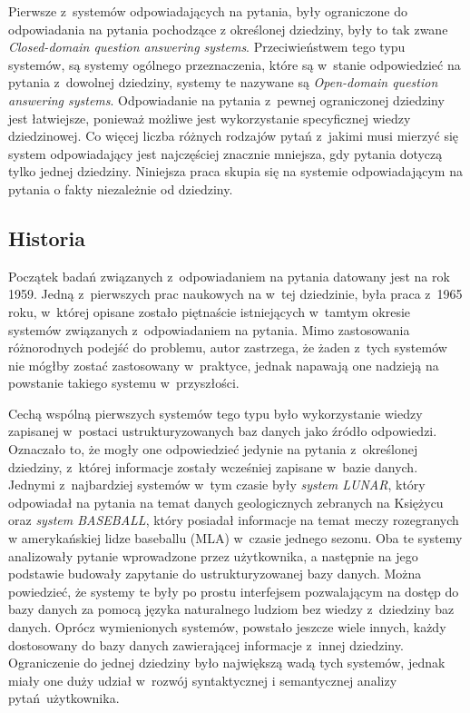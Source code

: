 \documentclass[a4paper, twoside, 12pt]{report}
\begin{document}
            Pierwsze z~systemów odpowiadających na pytania, były ograniczone do odpowiadania na pytania pochodzące z
            określonej dziedziny, były to tak zwane \emph{Closed-domain question answering systems}. Przeciwieństwem
            tego typu systemów, są systemy ogólnego przeznaczenia, które są w~stanie odpowiedzieć na pytania z~dowolnej
            dziedziny, systemy te nazywane są \emph{Open-domain question answering systems}. Odpowiadanie
            na pytania z~pewnej ograniczonej dziedziny jest łatwiejsze, ponieważ możliwe jest wykorzystanie specyficznej
            wiedzy dziedzinowej. Co więcej liczba różnych rodzajów pytań z~jakimi musi mierzyć się system odpowiadający
            jest najczęściej znacznie mniejsza, gdy pytania dotyczą tylko jednej dziedziny. Niniejsza praca skupia się
            na systemie odpowiadającym na pytania o fakty niezależnie od dziedziny.

        \subsection{Historia}
            Początek badań związanych z~odpowiadaniem na pytania datowany jest na rok 1959. Jedną z~pierwszych prac
            naukowych na w~tej dziedzinie, była praca z~1965 roku\cite{FIRSTWORKQA}, w~której opisane zostało piętnaście
            istniejących w~tamtym okresie systemów związanych z~odpowiadaniem na pytania. Mimo zastosowania różnorodnych
            podejść do problemu, autor zastrzega, że żaden z~tych systemów nie mógłby zostać zastosowany w~praktyce,
            jednak napawają one nadzieją na powstanie takiego systemu w~przyszłości.

            Cechą wspólną pierwszych systemów tego typu było wykorzystanie wiedzy zapisanej w~postaci ustrukturyzowanych
            baz danych jako źródło odpowiedzi. Oznaczało to, że mogły one odpowiedzieć jedynie na pytania z~określonej
            dziedziny, z~której informacje zostały wcześniej zapisane w~bazie danych. Jednymi z~najbardziej systemów
            w~tym czasie były \emph{system LUNAR}\cite{LUNAR}, który odpowiadał na pytania na temat danych geologicznych
            zebranych na Księżycu oraz \emph{system BASEBALL}\cite{BASEBALL}, który posiadał informacje na temat meczy rozegranych w
            amerykańskiej lidze baseballu (MLA) w~czasie jednego sezonu. Oba te systemy analizowały pytanie wprowadzone
            przez użytkownika, a następnie na jego podstawie budowały zapytanie do ustrukturyzowanej bazy danych. Można
            powiedzieć, że systemy te były po prostu interfejsem pozwalającym na dostęp do bazy danych za pomocą języka
            naturalnego ludziom bez wiedzy z~dziedziny baz danych. Oprócz wymienionych systemów, powstało jeszcze wiele
            innych, każdy dostosowany do bazy danych zawierającej informacje z~innej dziedziny. Ograniczenie do jednej
            dziedziny było największą wadą tych systemów, jednak miały one duży udział w~rozwój syntaktycznej i
            semantycznej analizy pytań użytkownika\cite{QASURVEY}.
\end{document}
